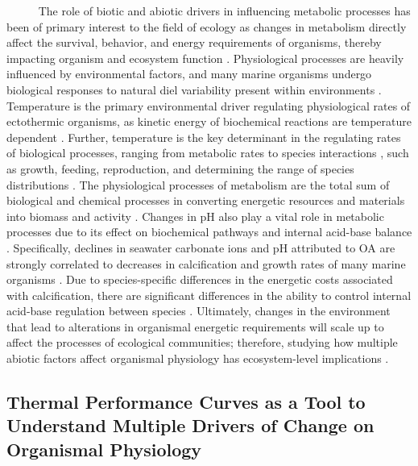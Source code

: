 \documentclass[
]{article}
\begin{document}
~~~~~ The role of biotic and abiotic drivers in influencing metabolic
processes has been of primary interest to the field of ecology as
changes in metabolism directly affect the survival, behavior, and energy
requirements of organisms, thereby impacting organism and ecosystem
function \citep{carey2016sea}. Physiological processes are heavily
influenced by environmental factors, and many marine organisms undergo
biological responses to natural diel variability present within
environments \citep{hofmann2010living}. Temperature is the primary
environmental driver regulating physiological rates of ectothermic
organisms, as kinetic energy of biochemical reactions are temperature
dependent
\citep{levins1968evolution, huey1979integrating, hochachka2002biochemical}.
Further, temperature is the key determinant in the regulating rates of
biological processes, ranging from metabolic rates
\citep{gillooly2001effects} to species interactions
\citep{sanford1999regulation}, such as growth, feeding, reproduction,
and determining the range of species distributions
\citep{kordas2011community, sanford2002feeding, pinsky2013marine}. The
physiological processes of metabolism are the total sum of biological
and chemical processes in converting energetic resources and materials
into biomass and activity \citep{brown2004metabolic}. Changes in pH also
play a vital role in metabolic processes due to its effect on
biochemical pathways and internal acid-base balance
\citep{gaylord2015ocean}. Specifically, declines in seawater carbonate
ions and pH attributed to OA are strongly correlated to decreases in
calcification and growth rates of many marine organisms
\citep{kroeker2013impacts}. Due to species-specific differences in the
energetic costs associated with calcification, there are significant
differences in the ability to control internal acid-base regulation
between species \citep{doney2009ocean}. Ultimately, changes in the
environment that lead to alterations in organismal energetic
requirements will scale up to affect the processes of ecological
communities; therefore, studying how multiple abiotic factors affect
organismal physiology has ecosystem-level implications
\citep{tomanek2002heat, barclay2019variation, kroeker2022ecological}.

\newpage

\hypertarget{thermal-performance-curves-as-a-tool-to-understand-multiple-drivers-of-change-on-organismal-physiology}{%
\subsection{Thermal Performance Curves as a Tool to Understand Multiple
Drivers of Change on Organismal
Physiology}\label{thermal-performance-curves-as-a-tool-to-understand-multiple-drivers-of-change-on-organismal-physiology}}
\end{document}
